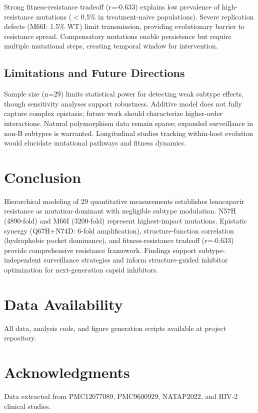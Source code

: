 \documentclass[twocolumn]{article}
\begin{document}
Strong fitness-resistance tradeoff (r=-0.633) explains low prevalence of high-resistance mutations ($<$0.5\% in treatment-naive populations)\cite{Andreatta2024}. Severe replication defects (M66I: 1.5\% WT) limit transmission, providing evolutionary barrier to resistance spread. Compensatory mutations enable persistence but require multiple mutational steps, creating temporal window for intervention.

\subsection{Limitations and Future Directions}

Sample size (n=29) limits statistical power for detecting weak subtype effects, though sensitivity analyses support robustness. Additive model does not fully capture complex epistasis; future work should characterize higher-order interactions. Natural polymorphism data remain sparse; expanded surveillance in non-B subtypes is warranted. Longitudinal studies tracking within-host evolution would elucidate mutational pathways and fitness dynamics.

\section{Conclusion}

Hierarchical modeling of 29 quantitative measurements establishes lenacapavir resistance as mutation-dominant with negligible subtype modulation. N57H (4890-fold) and M66I (3200-fold) represent highest-impact mutations. Epistatic synergy (Q67H+N74D: 6-fold amplification), structure-function correlation (hydrophobic pocket dominance), and fitness-resistance tradeoff (r=-0.633) provide comprehensive resistance framework. Findings support subtype-independent surveillance strategies and inform structure-guided inhibitor optimization for next-generation capsid inhibitors.

\section*{Data Availability}
All data, analysis code, and figure generation scripts available at project repository.

\section*{Acknowledgments}
Data extracted from PMC12077089, PMC9600929, NATAP2022, and HIV-2 clinical studies.
\end{document}

